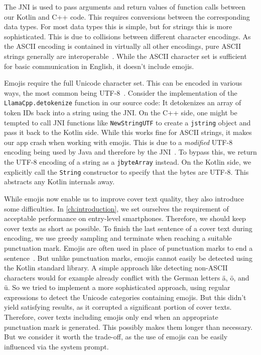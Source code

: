The \gls{JNI} is used to pass arguments and return values of function calls between our Kotlin and C++ code. This requires conversions between the corresponding data types. For most data types this is simple, but for strings this is more sophisticated. This is due to collisions between different character encodings. As the ASCII encoding is contained in virtually all other encodings, pure ASCII strings generally are interoperable~\cite{gleaveMakingCompressionAlgorithms2017}. While the ASCII character set is sufficient for basic communication in English, it doesn't include emojis.

Emojis require the full Unicode character set. This can be encoded in various ways, the most common being UTF-8~\cite{gleaveMakingCompressionAlgorithms2017}. Consider the implementation of the \lstinline|LlamaCpp.detokenize| function in our source code: It detokenizes an array of token IDs back into a string using the \gls{JNI}. On the C++ side, one might be tempted to call \gls{JNI} functions like \lstinline|NewStringUTF| to create a \lstinline|jstring| object and pass it back to the Kotlin side. While this works fine for ASCII strings, it makes our app crash when working with emojis. This is due to a \textit{modified} UTF-8 encoding being used by Java and therefore by the \gls{JNI}~\cite{oracleJNIFunctions}. To bypass this, we return the UTF-8 encoding of a string as a \lstinline|jbyteArray| instead. On the Kotlin side, we explicitly call the \lstinline|String| constructor to specify that the bytes are UTF-8. This abstracts any Kotlin internals away.

While emojis now enable us to improve cover text quality, they also introduce some difficulties. In \cref{ch:introduction}, we set ourselves the requirement of acceptable performance on entry-level smartphones. Therefore, we should keep cover texts as short as possible. To finish the last sentence of a cover text during encoding, we use greedy sampling and terminate when reaching a suitable punctuation mark. Emojis are often used in place of punctuation marks to end a sentence~\cite{zhouGoodbyeTextHello2017}. But unlike punctuation marks, emojis cannot easily be detected using the Kotlin standard library. A simple approach like detecting non-ASCII characters would for example already conflict with the German letters ä, ö, and ü. So we tried to implement a more sophisticated approach, using regular expressions to detect the Unicode categories containing emojis. But this didn't yield satisfying results, as it corrupted a significant portion of cover texts. Therefore, cover texts including emojis only end when an appropriate punctuation mark is generated. This possibly makes them longer than necessary. But we consider it worth the trade-off, as the use of emojis can be easily influenced via the system prompt.
